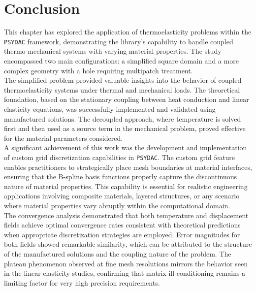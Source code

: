 \documentclass[a4paper,12pt,twoside]{report}
\begin{document}
\section{Conclusion}

This chapter has explored the application of thermoelasticity problems within the \texttt{PSYDAC} framework, demonstrating the library's capability to handle coupled thermo-mechanical systems with varying material properties. The study encompassed two main configurations: a simplified square domain and a more complex geometry with a hole requiring multipatch treatment. \\

The simplified problem provided valuable insights into the behavior of coupled thermoelasticity systems under thermal and mechanical loads. The theoretical foundation, based on the stationary coupling between heat conduction and linear elasticity equations, was successfully implemented and validated using manufactured solutions. The decoupled approach, where temperature is solved first and then used as a source term in the mechanical problem, proved effective for the material parameters considered. \\

A significant achievement of this work was the development and implementation of custom grid discretization capabilities in \texttt{PSYDAC}. The custom grid feature enables practitioners to strategically place mesh boundaries at material interfaces, ensuring that the B-spline basis functions properly capture the discontinuous nature of material properties. This capability is essential for realistic engineering applications involving composite materials, layered structures, or any scenario where material properties vary abruptly within the computational domain. \\

The convergence analysis demonstrated that both temperature and displacement fields achieve optimal convergence rates consistent with theoretical predictions when appropriate discretization strategies are employed. Error magnitudes for both fields showed remarkable similarity, which can be attributed to the structure of the manufactured solutions and the coupling nature of the problem. The plateau phenomenon observed at fine mesh resolutions mirrors the behavior seen in the linear elasticity studies, confirming that matrix ill-conditioning remains a limiting factor for very high precision requirements. \\
\end{document}

